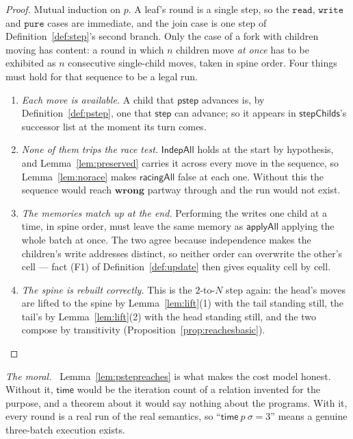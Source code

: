 \documentclass[11pt,a4paper]{article}
\theoremstyle{definition}
\theoremstyle{plain}
\theoremstyle{remark}
\newenvironment{moral}{\par\medskip\noindent\textit{The moral.}\ \ignorespaces}{\par\medskip}
\newcommand{\st}{\sigma}
\newcommand{\spn}{\mathsf{time}}
\newcommand{\pstep}{\mathsf{pstep}}
\newcommand{\wrong}{\mathbf{wrong}}
\begin{document}
\begin{proof}
Mutual induction on $p$. A leaf's round is a single step, so the $\texttt{read}$,
$\texttt{write}$ and $\texttt{pure}$ cases are immediate, and the join case is one step of
Definition~\ref{def:step}'s second branch. Only the case of a fork with children moving has
content: a round in which $n$ children move \emph{at once} has to be exhibited as $n$
consecutive single-child moves, taken in spine order. Four things must hold for that sequence
to be a legal run.
\begin{enumerate}[label=(\arabic*),leftmargin=2em,itemsep=1pt]
\item \emph{Each move is available.} A child that $\pstep$ advances is, by
      Definition~\ref{def:pstep}, one that $\mathsf{step}$ can advance; so it appears in
      $\mathsf{stepChilds}$'s successor list at the moment its turn comes.
\item \emph{None of them trips the race test.} $\mathsf{IndepAll}$ holds at the start by
      hypothesis, and Lemma~\ref{lem:preserved} carries it across every move in the sequence,
      so Lemma~\ref{lem:norace} makes $\mathsf{racingAll}$ false at each one. Without this the
      sequence would reach $\wrong$ partway through and the run would not exist.
\item \emph{The memories match up at the end.} Performing the writes one child at a time, in
      spine order, must leave the same memory as $\mathsf{applyAll}$ applying the whole batch
      at once. The two agree because independence makes the children's write addresses
      distinct, so neither order can overwrite the other's cell --- fact (F1) of
      Definition~\ref{def:update} then gives equality cell by cell.
\item \emph{The spine is rebuilt correctly.} This is the $2$-to-$N$ step again: the head's
      moves are lifted to the spine by Lemma~\ref{lem:lift}(1) with the tail standing still,
      the tail's by Lemma~\ref{lem:lift}(2) with the head standing still, and the two compose
      by transitivity (Proposition~\ref{prop:reachesbasic}).
\end{enumerate}
\end{proof}

\begin{moral}
Lemma~\ref{lem:pstepreaches} is what makes the cost model honest. Without it, $\spn$ would be
the iteration count of a relation invented for the purpose, and a theorem about it would say
nothing about the programs. With it, every round is a real run of the real semantics, so
``$\spn\ p\ \st = 3$'' means a genuine three-batch execution exists.
\end{moral}
\end{document}
